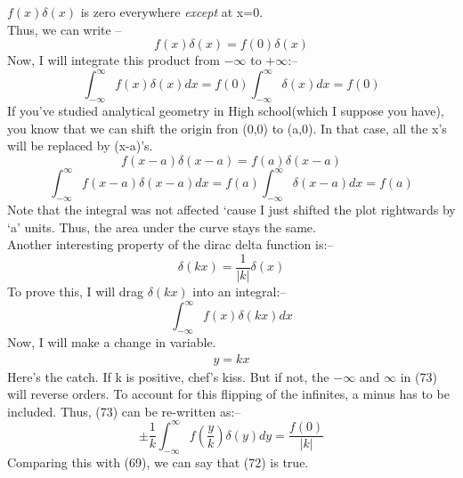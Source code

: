\documentclass[12pt]{article}
\begin{document}
$f(x)\delta(x)$ is zero everywhere \textit{except} at x=0.\\
Thus, we can write --
\begin{equation}
    f(x)\delta(x)=f(0)\delta(x)
\end{equation}
Now, I will integrate this product from $-\infty$ to $+\infty$:--
\begin{equation}
    \int_{-\infty}^{\infty}f(x)\delta(x)dx=f(0)\int_{-\infty}^{\infty}\delta(x)dx=f(0)
\end{equation}
If you've studied analytical geometry in High school(which I suppose you have), you know that we can shift the origin fron (0,0) to (a,0). In that case, all the x's will be replaced by (x-a)'s. 
\begin{equation}
    f(x-a)\delta(x-a)=f(a)\delta(x-a)
\end{equation}
\begin{equation}
    \int_{-\infty}^{\infty}f(x-a)\delta(x-a)dx=f(a)\int_{-\infty}^{\infty}\delta(x-a)dx=f(a)
\end{equation}
Note that the integral was not affected `cause I just shifted the plot rightwards by `a' units. Thus, the area under the curve stays the same. \\
Another interesting property of the dirac delta function is:--
\begin{equation}
    \delta(kx)=\frac{1}{|k|}\delta(x)
\end{equation}
To prove this, I will drag $\delta(kx)$ into an integral:--
\begin{equation}
    \int_{-\infty}^{\infty}f(x)\delta(kx)dx
\end{equation}
Now, I will make a change in variable.
\begin{align}
    y=kx
\end{align}
Here's the catch. If k is positive, chef's kiss. But if not, the $-\infty$ and $\infty$ in (73) will reverse orders. To account for this flipping of the infinites, a minus has to be included.
Thus, (73) can be re-written as:--
\begin{equation}
    \pm\frac{1}{k}\int_{-\infty}^{\infty}f\left(\frac{y}{k}\right)\delta(y)dy=\frac{f(0)}{|k|}
\end{equation}
Comparing this with (69), we can say that (72) is true.
\end{document}
